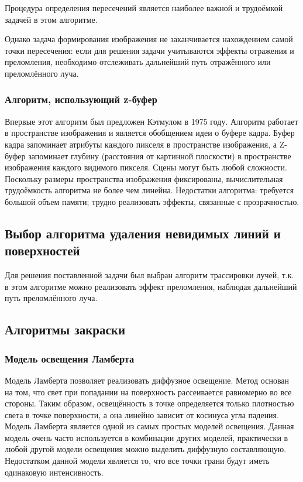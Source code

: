\documentclass[14pt,a4paper]{extarticle}
\begin{document}
     		Процедура определения пересечений является наиболее важной и трудоёмкой задачей в этом алгоритме.
     
     		Однако задача формирования изображения не заканчивается нахождением самой точки пересечения: 
     		если для решения задачи учитываются эффекты отражения и преломления, 
     		необходимо отслеживать дальнейший путь отражённого или преломлённого луча.
    
    	\subsubsection*{Алгоритм, использующий z-буфер}
    
   			Впервые этот алгоритм был предложен Кэтмулом в 1975 году.
   			Алгоритм работает в пространстве изображения и является обобщением идеи о буфере кадра. 
   			Буфер кадра запоминает атрибуты каждого пикселя в пространстве изображения, 
   			а Z-буфер запоминает глубину (расстояния от картинной плоскости) в пространстве изображения каждого видимого пикселя. 
   			Сцены могут быть любой сложности. 
   			Поскольку размеры пространства изображения фиксированы, вычислительная трудоёмкость алгоритма не более чем линейна. 
   			Недостатки алгоритма: требуется большой объем памяти; трудно реализовать эффекты, связанные с прозрачностью.
   
    \subsection{Выбор алгоритма удаления невидимых линий и поверхностей}
    
    	Для решения поставленной задачи был выбран алгоритм трассировки лучей, 
    	т.к. в этом алгоритме можно реализовать эффект преломления, наблюдая дальнейший путь преломлённого луча.
    
    \subsection{Алгоритмы закраски}   
        \subsubsection*{Модель освещения Ламберта}
    		Модель Ламберта позволяет реализовать диффузное освещение. 
    		Метод основан на том, что свет при попадании на поверхность рассеивается равномерно во все стороны. 
    		Таким образом, освещённость в точке определяется только плотностью света в точке поверхности, 
    		а она линейно зависит от косинуса угла падения. 
    		Модель Ламберта является одной из самых простых моделей освещения. 
    		Данная модель очень часто используется в комбинации других моделей, 
    		практически в любой другой модели освещения можно выделить диффузную составляющую. 
    		Недостатком данной модели является то, что все точки грани будут иметь одинаковую интенсивность.
    
\end{document}
